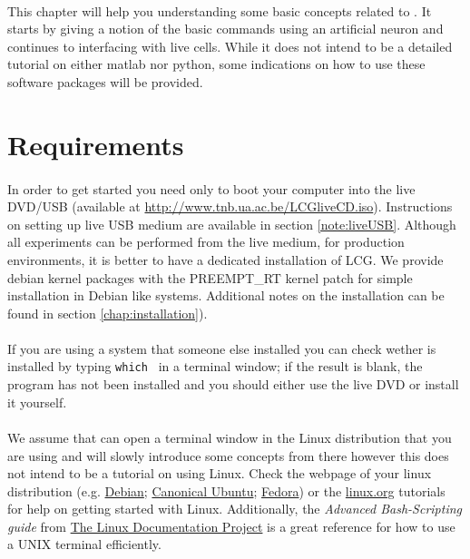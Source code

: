 \paragraph{}
This chapter will help you understanding some basic concepts related to \progname. It starts by giving a notion of the basic commands using an artificial neuron and continues to interfacing with live cells. While it does not intend to be a detailed tutorial on either matlab nor python, some indications on how to use these software packages will be provided.

\section{Requirements}
\paragraph{}
In order to get started you need only to boot your computer into the live DVD/USB (available at \url{http://www.tnb.ua.ac.be/LCGliveCD.iso}). Instructions on setting up live USB medium are available in section \ref{note:liveUSB}.
Although all experiments can be performed from the live medium, for production environments, it is better to have a dedicated installation of LCG. We provide debian kernel packages with  the PREEMPT\_RT kernel patch for simple installation in Debian like systems. Additional notes on the installation can be found in section \ref{chap:installation}).

\paragraph{}If you are using a system that someone else installed you can check wether \progname is installed  by typing  \texttt{which \progname} in a terminal window; if the result is blank, the program has not been installed and you should either use the live DVD or install it yourself. 

\paragraph{}
We assume that can open a terminal window in the Linux distribution that you are using and will slowly introduce some concepts from there however this does not intend to be a tutorial on using Linux. 
Check the webpage of your linux distribution (e.g. \href{http://www.debian.org}{Debian}; \href{http://www.ubuntu.com}{Canonical Ubuntu}; \href{http://www.fedoraproject.org}{Fedora}) or the \href{http://www.linux.org/tutorial}{linux.org} tutorials for help on getting started with Linux. Additionally, the \emph{Advanced Bash-Scripting guide} from \href{http://www.tldp.org}{The Linux Documentation Project} is a great reference for how to use a UNIX terminal efficiently.

